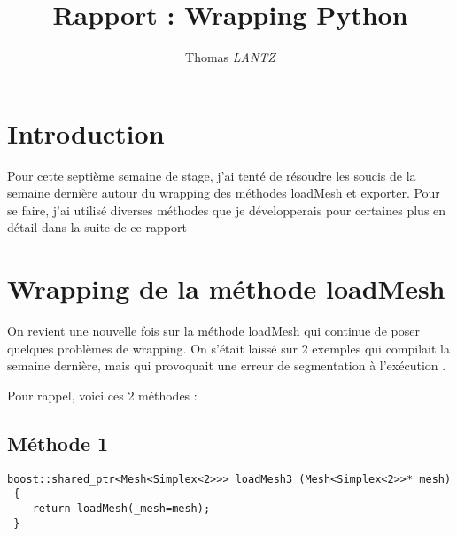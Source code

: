 \documentclass[12pt]{article}
\title {Rapport : Wrapping Python}
\author {Thomas \emph{LANTZ}}
\begin{document}
\maketitle 

\section{Introduction}

Pour cette septième semaine de stage, j'ai tenté de résoudre les soucis de la semaine dernière autour du wrapping des méthodes loadMesh et exporter.
Pour se faire, j'ai utilisé diverses méthodes que je développerais pour certaines plus en détail dans la suite de ce rapport 

\section{Wrapping de la méthode loadMesh}

On revient une nouvelle fois sur la méthode loadMesh qui continue de poser quelques problèmes de wrapping. On s'était laissé sur 2 exemples qui compilait la semaine dernière, mais qui provoquait une erreur de segmentation à l'exécution .

Pour rappel, voici ces 2 méthodes :

\subsection{Méthode 1}
\begin{lstlisting}
boost::shared_ptr<Mesh<Simplex<2>>> loadMesh3 (Mesh<Simplex<2>>* mesh)
 {
    return loadMesh(_mesh=mesh);
 }
\end{lstlisting}

\vspace{0.5 cm}
\end{document}
